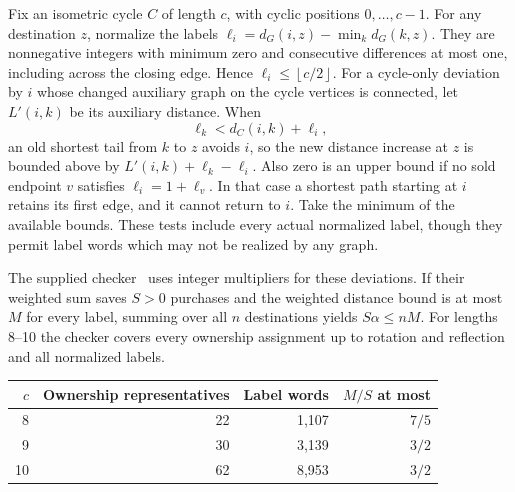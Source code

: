\documentclass[11pt]{article}
\newcommand{\dG}{d_G}
\newcommand{\floor}[1]{\left\lfloor#1\right\rfloor}
\begin{document}
Fix an isometric cycle \(C\) of length \(c\), with cyclic
positions \(0,\ldots,c-1\). For any destination \(z\), normalize
the labels \(\ell_i=\dG(i,z)-\min_k\dG(k,z)\).
They are nonnegative integers with minimum zero and consecutive
differences at most one, including across the closing edge.
Hence \(\ell_i\le\floor{c/2}\). For a cycle-only deviation by
\(i\) whose changed auxiliary graph on the cycle vertices
is connected, let \(L'(i,k)\) be its auxiliary distance.
When
\[
 \ell_k<d_C(i,k)+\ell_i ,
\]
an old shortest tail from \(k\) to \(z\) avoids \(i\), so the
new distance increase at \(z\) is bounded above by
\(L'(i,k)+\ell_k-\ell_i\). Also zero is an upper bound if no
sold endpoint \(v\) satisfies \(\ell_i=1+\ell_v\). In that
case a shortest path starting at \(i\) retains its first edge,
and it cannot return to \(i\). Take the minimum of the
available bounds. These tests include every actual normalized
label, though they permit label words which may not be realized
by any graph.

The supplied checker~\cite{release} uses integer multipliers
for these deviations. If their weighted sum saves \(S>0\) purchases
and the weighted distance bound is at most \(M\) for every label,
summing over all \(n\) destinations yields \(S\alpha\le nM\).
For lengths 8--10 the checker covers every ownership assignment
up to rotation and reflection and all normalized labels.
\begin{center}
\begin{tabular}{rrrr}
\toprule
\(c\) & Ownership representatives & Label words & \(M/S\) at most \\
\midrule
8  & 22 & 1,107 & \(7/5\) \\
9  & 30 & 3,139 & \(3/2\) \\
10 & 62 & 8,953 & \(3/2\) \\
\bottomrule
\end{tabular}
\end{center}
\end{document}
